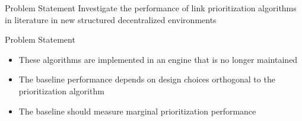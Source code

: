 \begin{frame}{Problem Statement}
    \centering
    Investigate the performance of link prioritization algorithms in literature in new structured decentralized environments
\end{frame}

\begin{frame}{Problem Statement}
    \begin{itemize}
        \item These algorithms are implemented in an engine that is no longer maintained
        \item The baseline performance depends on design choices orthogonal to the prioritization algorithm
        \item The baseline should measure marginal prioritization performance
    \end{itemize}
\end{frame}
